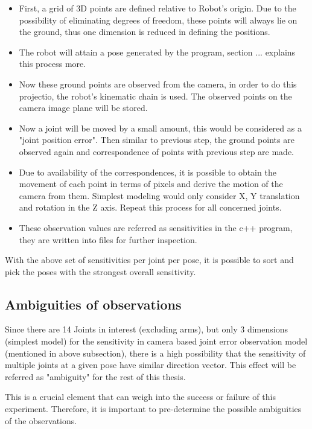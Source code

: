 \documentclass[english, printversion, nomenclature, notitle]{tuvisionthesis} %
\begin{document}
\begin{itemize}
	\item First, a grid of 3D points are defined relative to Robot's origin. Due to the possibility of eliminating degrees of freedom, these points will always lie on the ground, thus one dimension is reduced in defining the positions.
	\item The robot will attain a pose generated by the program, section ...  explains this process more.
	\item Now these ground points are observed from the camera, in order to do this projectio, the robot's kinematic chain is used. The observed points on the camera image plane will be stored.
	\item Now a joint will be moved by a small amount, this would be considered as a "joint position error". Then similar to previous step, the ground points are observed again and correspondence of points with previous step are made.
	\item Due to availability of the correspondences, it is possible to obtain the movement of each point in terms of pixels and derive the motion of the camera from them. Simplest modeling would only consider X, Y translation and rotation in the Z axis. Repeat this process for all concerned joints.
	\item These observation values are referred as sensitivities in the c++ program, they are written into files for further inspection.	
\end{itemize}

With the above set of sensitivities per joint per pose, it is possible to sort and pick the poses with the strongest overall sensitivity.

\subsection{Ambiguities of observations}
\label{subsec:ambiguities}

Since there are 14 Joints in interest (excluding arms), but only 3 dimensions (simplest model) for the sensitivity in camera based joint error observation model (mentioned in above subsection), there is a high possibility that the sensitivity of multiple joints at a given pose have similar direction vector. This effect will be referred as "ambiguity" for the rest of this thesis.
 
This is a crucial element that can weigh into the success or failure of this experiment. Therefore, it is important to pre-determine the possible ambiguities of the observations. 
\end{document}
